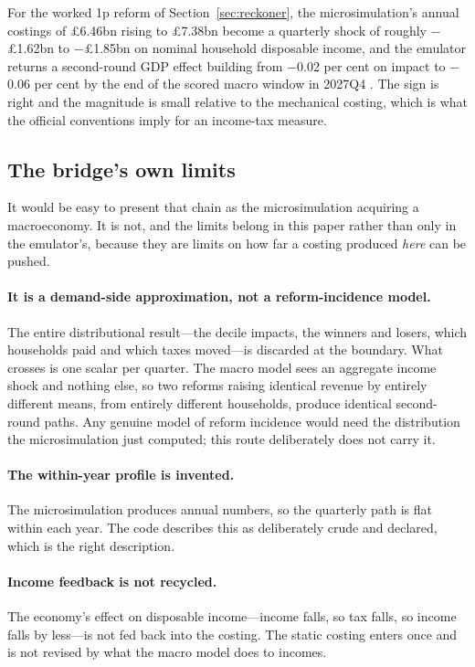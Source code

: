 For the worked 1p reform of Section~\ref{sec:reckoner}, the microsimulation's annual costings of \pounds 6.46bn rising to \pounds 7.38bn become a quarterly shock of roughly $-$\pounds 1.62bn to $-$\pounds 1.85bn on nominal household disposable income, and the emulator returns a second-round GDP effect building from $-$0.02 per cent on impact to $-$0.06 per cent by the end of the scored macro window in 2027Q4 \citep{ahmadi2026obr}. The sign is right and the magnitude is small relative to the mechanical costing, which is what the official conventions imply for an income-tax measure.

\subsection{The bridge's own limits}
\label{sec:bridgelimits}

It would be easy to present that chain as the microsimulation acquiring a macroeconomy. It is not, and the limits belong in this paper rather than only in the emulator's, because they are limits on how far a costing produced \emph{here} can be pushed.

\paragraph{It is a demand-side approximation, not a reform-incidence model.} The entire distributional result---the decile impacts, the winners and losers, which households paid and which taxes moved---is discarded at the boundary. What crosses is one scalar per quarter. The macro model sees an aggregate income shock and nothing else, so two reforms raising identical revenue by entirely different means, from entirely different households, produce identical second-round paths. Any genuine model of reform incidence would need the distribution the microsimulation just computed; this route deliberately does not carry it.

\paragraph{The within-year profile is invented.} The microsimulation produces annual numbers, so the quarterly path is flat within each year. The code describes this as deliberately crude and declared, which is the right description.

\paragraph{Income feedback is not recycled.} The economy's effect on disposable income---income falls, so tax falls, so income falls by less---is not fed back into the costing. The static costing enters once and is not revised by what the macro model does to incomes.

